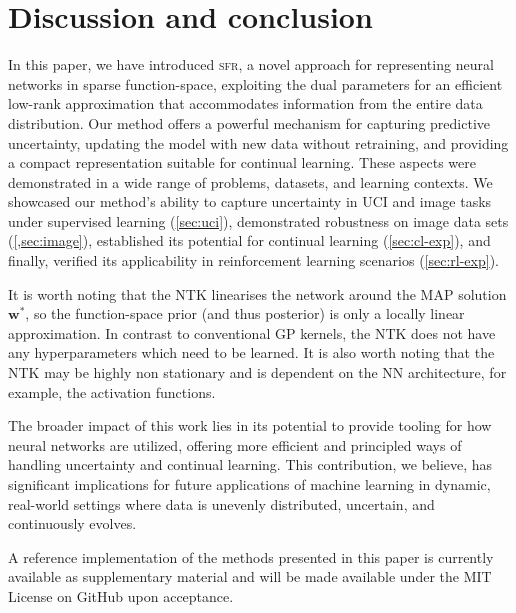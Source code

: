 \documentclass{article}
\newcommand{\our}{\textsc{sfr}\xspace}
\newcommand{\weights}{\ensuremath{\mathbf{w}}}
\begin{document}
\section{Discussion and conclusion}
\label{sec:conclusion}
%
In this paper, we have introduced \our, a novel approach for representing neural networks in sparse function-space, exploiting the dual parameters for an efficient low-rank approximation that accommodates information from the entire data distribution. Our method offers a powerful mechanism for capturing predictive uncertainty, updating the model with new data without retraining, and providing a compact representation suitable for continual learning. These aspects were demonstrated in a wide range of problems, datasets, and learning contexts. We showcased our method's ability to capture uncertainty in UCI and image tasks under supervised learning (\cref{sec:uci}), demonstrated robustness on image data sets (\cref{,sec:image}), established its potential for continual learning (\cref{sec:cl-exp}), and finally, verified its applicability in reinforcement learning scenarios (\cref{sec:rl-exp}).

It is worth noting that the NTK linearises the network around the MAP solution $\weights^{*}$,
so the function-space prior (and thus posterior) is only a locally linear approximation.
In contrast to conventional GP kernels, the NTK does not have any hyperparameters which need to be learned.
It is also worth noting that the NTK may be highly non stationary and is dependent on the NN architecture, for example, the activation functions.




The broader impact of this work lies in its potential to provide tooling for how neural networks are utilized, offering more efficient and principled ways of handling uncertainty and continual learning. This contribution, we believe, has significant implications for future applications of machine learning in dynamic, real-world settings where data is unevenly distributed, uncertain, and continuously evolves.

A reference implementation of the methods presented in this paper is currently available as supplementary material and will be made available under the MIT License on GitHub upon acceptance.


\end{document}
